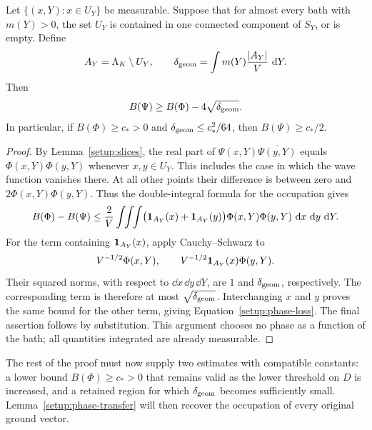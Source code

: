 \begin{lemma}\label{setup:phase-transfer}
Let $\{(x,Y):x\in U_Y\}$ be measurable. Suppose that for almost every
bath with $m(Y)>0$, the set $U_Y$ is contained in one connected
component of $S_Y$, or is empty. Define
\[
 A_Y=\Lambda_K\setminus U_Y,\qquad
 \delta_{\rm geom}=\int m(Y)\frac{|A_Y|}{V}\,\,\mathrm d Y.
\]
Then
\begin{equation}\label{setup:phase-loss}
 B(\Psi)\ge B(\Phi)-4\sqrt{\delta_{\rm geom}}.
\end{equation}
In particular, if $B(\Phi)\ge c_*>0$ and
$\delta_{\rm geom}\le c_*^2/64$, then $B(\Psi)\ge c_*/2$.
\end{lemma}

\begin{proof}
By Lemma~\ref{setup:slices}, the real part of
$\Psi(x,Y)\overline{\Psi(y,Y)}$ equals $\Phi(x,Y)\Phi(y,Y)$
whenever $x,y\in U_Y$. This includes the case in which the wave
function vanishes there. At all other points their difference is
between zero and $2\Phi(x,Y)\Phi(y,Y)$. Thus the double-integral
formula for the occupation gives
\[
 B(\Phi)-B(\Psi)
 \le\frac2V\int\!\!\int\!\!\int
   \bigl(\mathbf 1_{A_Y}(x)+\mathbf 1_{A_Y}(y)\bigr)
   \Phi(x,Y)\Phi(y,Y)\,\,\mathrm d x\,\,\mathrm d y\,\,\mathrm d Y.
\]
For the term containing $\mathbf 1_{A_Y}(x)$, apply Cauchy--Schwarz to
\[
 V^{-1/2}\Phi(x,Y),\qquad
 V^{-1/2}\mathbf 1_{A_Y}(x)\Phi(y,Y).
\]
Their squared norms, with respect to $\dd x\,\dd y\,\dd Y$, are
$1$ and $\delta_{\rm geom}$, respectively. The corresponding term is
therefore at most $\sqrt{\delta_{\rm geom}}$. Interchanging $x$ and
$y$ proves the same bound for the other term, giving
Equation~\eqref{setup:phase-loss}. The final assertion follows by
substitution. This argument chooses no phase as a function of the bath;
all quantities integrated are already measurable.
\end{proof}

The rest of the proof must now supply two estimates with compatible
constants: a lower bound $B(\Phi)\ge c_*>0$ that remains valid as the
lower threshold on $D$ is increased, and a retained region for which
$\delta_{\rm geom}$ becomes sufficiently small. Lemma~\ref{setup:phase-transfer}
will then recover the occupation of every original ground vector.
